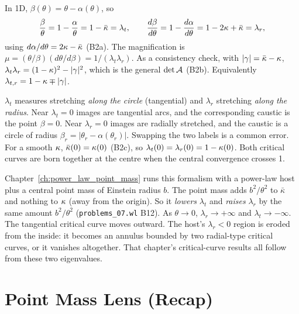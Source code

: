 \begin{derivation}
In 1D, $\beta(\theta) = \theta-\alpha(\theta)$, so
\[
  \frac{\beta}{\theta} = 1-\frac{\alpha}{\theta} = 1-\bar\kappa = \lambda_t,
  \qquad
  \frac{d\beta}{d\theta} = 1-\frac{d\alpha}{d\theta} = 1-2\kappa+\bar\kappa = \lambda_r ,
\]
using $d\alpha/d\theta = 2\kappa-\bar\kappa$ (B2a).  The magnification is
$\mu = (\theta/\beta)(d\theta/d\beta) = 1/(\lambda_t\lambda_r)$.  As a
consistency check, with $|\gamma| = \bar\kappa-\kappa$,
$\lambda_t\lambda_r = (1-\kappa)^2-|\gamma|^2$, which is the general
$\det\mathcal{A}$ (B2b).  Equivalently $\lambda_{t,r} = 1-\kappa\mp|\gamma|$.
\end{derivation}

\begin{annotation}
$\lambda_t$ measures stretching \emph{along the circle} (tangential) and
$\lambda_r$ stretching \emph{along the radius}.  Near $\lambda_t = 0$ images
are tangential arcs, and the corresponding caustic is the point $\beta = 0$.
Near $\lambda_r = 0$ images are radially stretched, and the caustic is a
circle of radius $\beta_r = |\theta_r-\alpha(\theta_r)|$.  Swapping the two
labels is a common error.  For a smooth $\kappa$,
$\bar\kappa(0) = \kappa(0)$ (B2c), so $\lambda_t(0) = \lambda_r(0) = 1-\kappa(0)$.
Both critical curves are born together at the centre when the central
convergence crosses 1.
\end{annotation}

\begin{bridge}
Chapter~\ref{ch:power_law_point_mass} runs this formalism with a power-law
host plus a central point mass of Einstein radius $b$.  The point mass adds
$b^2/\theta^2$ to $\bar\kappa$ and nothing to $\kappa$ (away from the
origin).  So it \emph{lowers} $\lambda_t$ and \emph{raises} $\lambda_r$ by
the same amount $b^2/\theta^2$ (\texttt{problems\_07.wl} B12).  As $\theta\to0$,
$\lambda_r\to+\infty$ and $\lambda_t\to-\infty$.  The tangential critical curve
moves outward.  The host's $\lambda_r<0$ region is eroded from the inside: it
becomes an annulus bounded by two radial-type critical curves, or it vanishes
altogether.  That chapter's critical-curve results all follow from these
two eigenvalues.
\end{bridge}


\section{Point Mass Lens (Recap)}
\label{sec:point_mass_recap}

